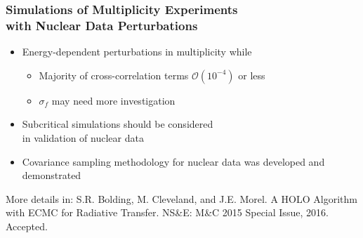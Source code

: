 \begin{frame}
\frametitle{Simulations of Multiplicity Experiments \\ with Nuclear Data Perturbations}
	\vspace{-0.2in}
\begin{itemize}
    \item[] Energy-dependent \nubar perturbations  in multiplicity while  \keff
      \begin{itemize}\vspace{0.1in}
		\item Majority of cross-correlation terms $\mathcal{O}(10^{-4})$ or less
            \vspace{-0.1in}
        \item $\sigma_f$ may need more investigation
            \\ 
	  \end{itemize}
      \item[] Subcritical simulations should be considered \\ in validation of nuclear data
      \item[] Covariance sampling methodology for nuclear data was developed and demonstrated
\end{itemize}
\end{frame} 

\begin{frame}
    \begin{tcolorbox}
    More details in: S.R. Bolding, M. Cleveland, and J.E. Morel. A HOLO Algorithm
with ECMC for Radiative Transfer. NS\&E: M\&C 2015 Special Issue, 2016. Accepted.
\end{tcolorbox}
    

\end{frame}


\author{S.R. Bolding, \and C.J. Solomon}
\date{4 August 2016}
\begin{frame}
\vspace{-0.2in}
\centering
\maketitle

\end{frame} 






















